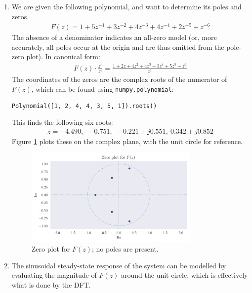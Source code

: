 \documentclass[a4paper, 11pt]{article}
\begin{document}
\begin{enumerate}[label=\alph*)]

    \item We are given the following polynomial, and want to determine its poles
    and zeros.
    \begin{align*}
        F(z) = 1 + 5z^{-1} + 3z^{-2} + 4z^{-3} + 4z^{-4} + 2z^{-5} + z^{-6}
    \end{align*}
    The absence of a denominator indicates an all-zero model (or, more
    accurately, all poles occur at the origin and are thus omitted from the
    pole-zero plot). In canonical form:
    \begin{align*}
        F(z) \cdot \frac{z^6}{z^6} = \frac{1 + 2z + 4z^{2} + 4z^{3} + 3z^{4} +
            5z^{5} + z^{6}}{z^6}
    \end{align*}
    The coordinates of the zeros are the complex roots of the numerator of
    $F(z)$, which can be found using \texttt{numpy.polynomial}:
    \begin{center}
        \texttt{Polynomial([1, 2, 4, 4, 3, 5, 1]).roots()}
    \end{center}
    This finds the following six roots:
    \begin{align*}
        z = -4.490,\ -0.751,\ -0.221\pm j0.551,\ 0.342\pm j0.852
    \end{align*}
    Figure \ref{fig:q5a_polezero} plots these on the complex plane, with the unit
    circle for reference.
    \begin{figure}[ht]
        \centering
        \includegraphics[width=0.8\textwidth]{images/q5a_polezero.png}
        \caption{Zero plot for $F(z)$; no poles are present.}
        \label{fig:q5a_polezero}
    \end{figure}

\newpage

    \item The sinusoidal steady-state response of the system can be modelled by
    evaluating the magnitude of $F(z)$ around the unit circle, which is
    effectively what is done by the DFT.


\end{enumerate}
\end{document}
